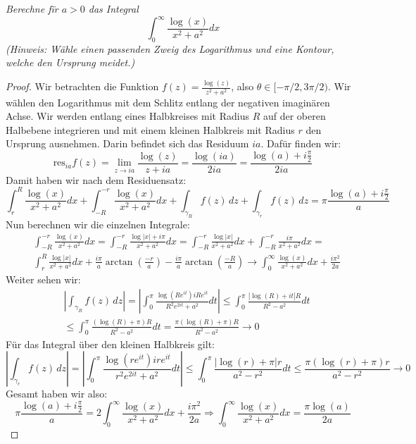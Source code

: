 \documentclass[11pt]{article}
\newcommand{\res}{\text{res}}
\newenvironment{problem}[2][Beispiel]{
    \begin{trivlist}
        \item[\hskip \labelsep {\bfseries #1}\hskip \labelsep {\bfseries #2.}] \itshape}{
    \end{trivlist}\normalshape
}
\begin{document}
    \begin{problem}{3}
        Berechne fïr $a>0$ das Integral
        $$
        \int_0^{\infty} \frac{\log (x)}{x^2+a^2} d x
        $$
        (Hinweis: Wähle einen passenden Zweig des Logarithmus und eine Kontour, welche den Ursprung meidet.)
    \end{problem}

    \begin{proof}
        Wir betrachten die Funktion $f(z)=\frac{\log(z)}{z^2+a^2}$, also $\theta\in[-\pi/2,3\pi/2)$.
        Wir wählen den Logarithmus mit dem Schlitz entlang der negativen imaginären Achse. Wir werden
        entlang eines Halbkreises mit Radius $R$ auf der oberen Halbebene integrieren und mit einem kleinen
        Halbkreis mit Radius $r$ den Ursprung ausnehmen. Darin befindet sich das Residuum $ia$. Dafür finden
        wir:
        $$\res_{ia} f(z) = \lim_{z\to ia}\frac{\log(z)}{z+ia}=\frac{\log(ia)}{2ia} = \frac{\log(a)+i\frac{\pi}{2}}
        {2ia}$$
        Damit haben wir nach dem Residuensatz:
        $$\int_r^R \frac{\log (x)}{x^2+a^2} d x+ \int_{-R}^{-r}\frac{\log(x)}{x^2+a^2} d x +
        \int_{\gamma_R}f(z)\,dz+\int_{\gamma_r}f(z)\,dz = \pi\frac{\log(a)+i\frac{\pi}{2}}{a}$$
        Nun berechnen wir die einzelnen Integrale:
        $$\begin{aligned}
              &\int_{-R}^{-r} \frac{\log(x)}{x^2+a^2} d x = \int_{-R}^{-r} \frac{\log|x|+i\pi}{x^2+a^2} d x
              = \int_{-R}^{-r}  \frac{\log|x|}{x^2+a^2} d x+\int_{-R}^{-r} \frac{i\pi}{x^2+a^2} d x =\\
              &\int_{r}^{R}\frac{\log|x|}{x^2+a^2} d x + \frac{i\pi}{a}\arctan\left(\frac{-r}{a}\right)
              -\frac{i\pi}{a}\arctan\left(\frac{-R}{a}\right)\to \int_0^\infty \frac{\log (x)}{x^2+a^2} d x +
              \frac{i\pi^2}{2a}
        \end{aligned}$$
        Weiter sehen wir:
        $$\begin{aligned}
              &\left|\int_{\gamma_R}f(z)\,dz\right|=\left|\int_0^{\pi}\frac{\log(Re^{it})iRe^{it}}{R^2e^{2it}+a^2}dt
              \right|\leq \int_0^{\pi}\frac{|\log(R)+it|R}{R^2-a^2}dt\\&\leq
              \int_0^{\pi}\frac{(\log(R)+\pi)R}{R^2-a^2}dt = \frac{\pi(\log(R)+\pi)R}{R^2-a^2}\to 0
        \end{aligned}$$
        Für das Integral über den kleinen Halbkreis gilt:
        $$\left|\int_{\gamma_r}f(z)\,dz\right| = \left|\int_0^\pi\frac{\log(re^{it})ire^{it}}{r^2e^{2it}+a^2}
        dt\right|\leq \int_0^\pi\frac{|\log(r)+\pi|r}{a^2-r^2}dt\leq \frac{\pi (\log(r)+\pi)r}{a^2-r^2}\to 0$$
        Gesamt haben wir also:
        $$\pi\frac{\log(a)+i\frac{\pi}{2}}{a} = 2 \int_0^\infty \frac{\log (x)}{x^2+a^2} d x +
        \frac{i\pi^2}{2a}\Rightarrow \int_0^\infty \frac{\log (x)}{x^2+a^2} d x = \frac{\pi\log(a)}{2a}$$
    \end{proof}
\end{document}
